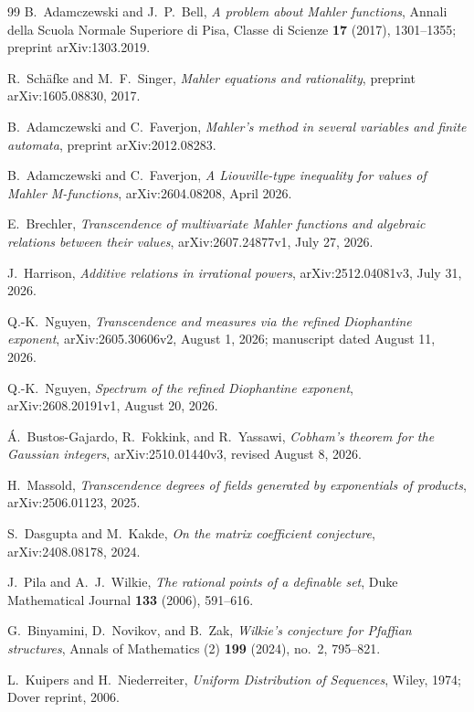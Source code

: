 \documentclass[11pt,oneside]{article}
\theoremstyle{definition}
\theoremstyle{remark}
\begin{document}
\begin{thebibliography}{99}
B.~Adamczewski and J.~P.~Bell,
\newblock \emph{A problem about Mahler functions},
\newblock Annali della Scuola Normale Superiore di Pisa, Classe di Scienze \textbf{17} (2017), 1301--1355;
preprint arXiv:1303.2019.

R.~Sch\"afke and M.~F.~Singer,
\newblock \emph{Mahler equations and rationality},
\newblock preprint arXiv:1605.08830, 2017.

B.~Adamczewski and C.~Faverjon,
\newblock \emph{Mahler's method in several variables and finite automata},
\newblock preprint arXiv:2012.08283.

B.~Adamczewski and C.~Faverjon,
\newblock \emph{A Liouville-type inequality for values of Mahler M-functions},
\newblock arXiv:2604.08208, April 2026.

E.~Brechler,
\newblock \emph{Transcendence of multivariate Mahler functions and algebraic relations between their values},
\newblock arXiv:2607.24877v1, July 27, 2026.

J.~Harrison,
\newblock \emph{Additive relations in irrational powers},
\newblock arXiv:2512.04081v3, July 31, 2026.

Q.-K.~Nguyen,
\newblock \emph{Transcendence and measures via the refined Diophantine exponent},
\newblock arXiv:2605.30606v2, August 1, 2026; manuscript dated August 11, 2026.

Q.-K.~Nguyen,
\newblock \emph{Spectrum of the refined Diophantine exponent},
\newblock arXiv:2608.20191v1, August 20, 2026.

\'A.~Bustos-Gajardo, R.~Fokkink, and R.~Yassawi,
\newblock \emph{Cobham's theorem for the Gaussian integers},
\newblock arXiv:2510.01440v3, revised August 8, 2026.

H.~Massold,
\newblock \emph{Transcendence degrees of fields generated by exponentials of products},
\newblock arXiv:2506.01123, 2025.

S.~Dasgupta and M.~Kakde,
\newblock \emph{On the matrix coefficient conjecture},
\newblock arXiv:2408.08178, 2024.

J.~Pila and A.~J.~Wilkie,
\newblock \emph{The rational points of a definable set},
\newblock Duke Mathematical Journal \textbf{133} (2006), 591--616.

G.~Binyamini, D.~Novikov, and B.~Zak,
\newblock \emph{Wilkie's conjecture for Pfaffian structures},
\newblock Annals of Mathematics (2) \textbf{199} (2024), no.~2, 795--821.

L.~Kuipers and H.~Niederreiter,
\newblock \emph{Uniform Distribution of Sequences},
\newblock Wiley, 1974; Dover reprint, 2006.

\end{thebibliography}
\end{document}
